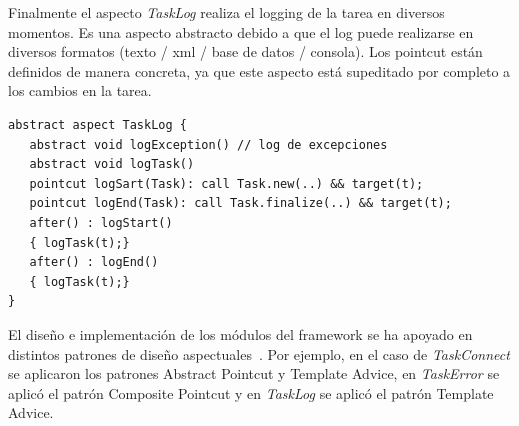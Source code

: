 Finalmente el aspecto \textit{TaskLog}  realiza el logging de la tarea en diversos momentos. Es una aspecto abstracto debido a que el log puede realizarse en diversos formatos (texto / xml / base de datos / consola). Los pointcut están definidos de manera concreta, ya que este aspecto está supeditado por completo a los cambios en la tarea.  
\squeezeup
\begin{verbatim}
abstract aspect TaskLog {
   abstract void logException() // log de excepciones
   abstract void logTask() 
   pointcut logSart(Task): call Task.new(..) && target(t);
   pointcut logEnd(Task): call Task.finalize(..) && target(t);
   after() : logStart()
   { logTask(t);}
   after() : logEnd()
   { logTask(t);}
}
\end{verbatim}
\squeezeup

El diseño e implementación de los módulos del framework se ha apoyado en distintos patrones de diseño aspectuales~\cite{HS2003}. Por ejemplo, en el caso de \textit{TaskConnect} se aplicaron los patrones Abstract Pointcut y Template Advice, en \textit{TaskError} se aplicó el patrón Composite Pointcut y en \textit{TaskLog} se aplicó el patrón Template Advice.